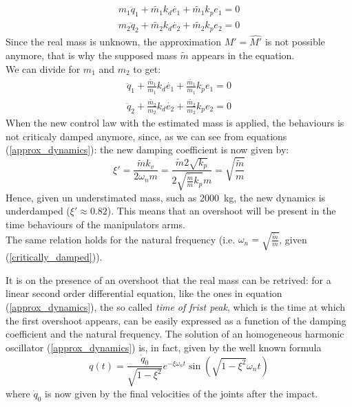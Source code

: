 \documentclass[a4paper,12pt,oneside]{report}
\begin{document}
\begin{equation}
  \begin{array}{l}
    m_1\ddot{q}_1+\tilde{m_1}k_d\dot{e_1}+\tilde{m_1}k_p e_1=0\\
    m_2\ddot{q}_2+\tilde{m_2}k_d\dot{e_2}+\tilde{m_2}k_p e_2=0
  \end{array}
\end{equation}
Since the real mass is unknown, the approximation $M'=\hat{M'}$ is not possible anymore, that is why the supposed mass $\tilde{m}$ appears in the equation.\\
We can divide for $m_1$ and $m_2$ to get:
\begin{equation}
  \begin{array}{l}
    \ddot{q}_1+\frac{\tilde{m_1}}{m_1}k_d\dot{e_1}+\frac{\tilde{m_1}}{m_1}k_p e_1=0\\
    \ddot{q}_2+\frac{\tilde{m_2}}{m_2}k_d\dot{e_2}+\frac{\tilde{m_2}}{m_2}k_p e_2=0
  \end{array}
  \label{approx_dynamics}
\end{equation}
When the new control law with the estimated mass is applied, the behaviours is not criticaly damped anymore, since, as we can see from equations (\ref{approx_dynamics}): the new damping coefficient is now given by:
\begin{equation}
  \xi'=\frac{\tilde{m}k_v}{2\omega_n m}=\frac{\tilde{m}2\sqrt{k_p}}{2\sqrt{\frac{\tilde{m}}{m}k_p} m}=\sqrt{\frac{\tilde{m}}{m}}
\end{equation}
Hence, given un understimated mass, such as \SI{2000}{\kilogram}, the new dynamics is underdamped ($\xi'\approx 0.82$). This means that an overshoot will be present in the time behaviours of the manipulators arms.\\
The same relation holds for the natural frequency (i.e. $\omega_n=\sqrt{\frac{\tilde{m}}{m}}$, given (\ref{critically_damped})).

It is on the presence of an overshoot that the real mass can be retrived: for a linear second order differential equation, like the ones in equation (\ref{approx_dynamics}), the so called \textit{time of frist peak}, which is the time at which the first overshoot appears, can be easily expressed as a function of the damping coefficient and the natural frequency.
The solution of an homogeneous harmonic oscillator (\ref{approx_dynamics}) is, in fact, given by the well known formula
\begin{equation}
  q(t)=\frac{\dot{q}_0}{\sqrt{1-\xi^2}}e^{-\xi \omega_n t}\sin{(\sqrt{1-\xi^2}\omega_nt)}
\end{equation}
where $\dot{q}_0$ is now given by the final velocities of the joints after the impact.\\
\end{document}
